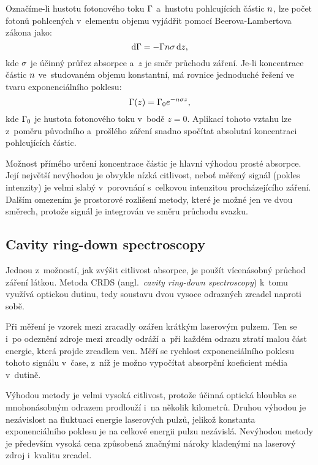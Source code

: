 Označíme-li hustotu fotonového toku $\Gamma$ a~hustotu pohlcujících
částic $n$, lze počet fotonů pohlcených v~elementu objemu vyjádřit
pomocí Beerova-Lambertova zákona jako:
\begin{equation}
	\label{eq:}
	\dd\Gamma = - \Gamma n \sigma \, \dd z,
\end{equation}
kde $\sigma$ je účinný průřez absorpce a~$z$ je směr průchodu záření.
Je-li koncentrace částic $n$ ve~studovaném objemu konstantní,
má rovnice jednoduché řešení ve tvaru exponenciálního poklesu:
\begin{equation}
	\label{eq:}
	\Gamma (z) = \Gamma_0 e^{-n\sigma z},
\end{equation}
kde $\Gamma_0$ je hustota fotonového toku v~bodě $z = 0$.
Aplikací tohoto vztahu lze z~poměru původního a~prošlého záření snadno
spočítat absolutní koncentraci pohlcujících částic.

Možnost přímého určení koncentrace částic je hlavní výhodou prosté absorpce.
Její největší nevýhodou je obvykle nízká citlivost, neboť měřený signál
(pokles intenzity) je velmi slabý v~porovnání s~celkovou intenzitou
procházejícího záření.
Dalším omezením je prostorové rozlišení metody, které je možné jen
ve dvou směrech, protože signál je integrován ve směru průchodu svazku.

\subsection{Cavity ring-down spectroscopy}
\label{sec:diagnostics-crds}
Jednou z~možností, jak zvýšit citlivost absorpce, je použít vícenásobný
průchod záření látkou.
Metoda CRDS (angl.~\emph{cavity ring-down spectroscopy})
k~tomu využívá optickou dutinu, tedy soustavu dvou vysoce
odrazných zrcadel naproti sobě.

Při měření je vzorek mezi zracadly ozářen krátkým laserovým pulzem.
Ten se i~po odeznění zdroje mezi zrcadly odráží a~při každém odrazu
ztratí malou část energie, která projde zrcadlem ven.
Měří se rychlost exponenciálního poklesu tohoto signálu v~čase,
z~níž je možno vypočítat absorpční koeficient média v~dutině.

Výhodou metody je velmi vysoká citlivost, protože účinná optická hloub\-ka
se mnohonásobným odrazem prodlouží i~na několik kilometrů.
Druhou výhodou je nezávislost na fluktuaci energie laserových pulzů,
jelikož konstanta exponenciálního poklesu je na celkové energii
pulzu nezávislá.
Nevýhodou metody je především vysoká cena způsobená značnými nároky
kladenými na laserový zdroj i~kvalitu zrcadel.
\autocite{wiki-crds}

